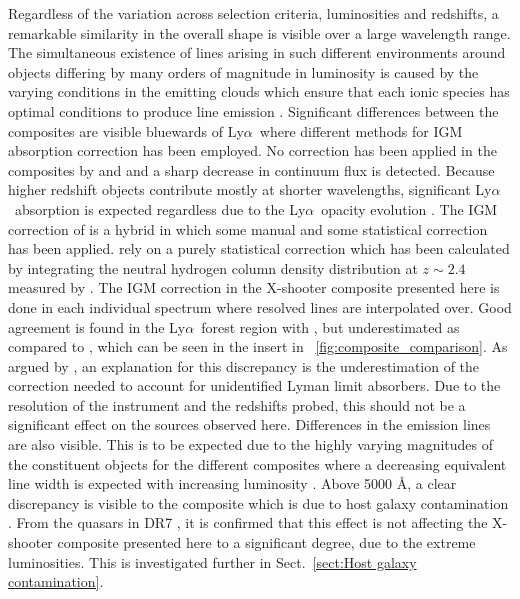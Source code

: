 \documentclass{aa}    %
\newcommand{\figref}[1]{\ref{fig:#1}}
\newcommand{\Fig}[1]{\figurename~\figref{#1}}
\newcommand{\fig}[1]{\Fig{#1}}
\newcommand{\sectionname}{Sect.}
\newcommand{\Sect}[1]{\sectionname~\ref{sect:#1}}
\newcommand{\sect}[1]{\Sect{#1}}
\newcommand{\lya}{Ly$\alpha$}
\begin{document}
Regardless of the variation across selection criteria, luminosities and
redshifts, a remarkable similarity in the overall shape is visible
over a large wavelength range. The simultaneous existence of lines
arising in such different environments around objects differing by
many orders of magnitude in luminosity is caused by the varying
conditions in the emitting clouds which ensure that each ionic species has optimal conditions to produce line emission \citep{Baldwin1995}.
Significant differences between the composites are visible bluewards of
\lya~where different methods for IGM absorption correction has been
employed. No correction has been applied in the composites by
\citet{Francis1991} and \citet{VandenBerk2001} and a sharp decrease in
continuum flux is detected. Because higher redshift objects contribute
mostly at shorter wavelengths, significant \lya~absorption is
expected regardless due to the \lya~opacity evolution
\citep{Moller1990, Madau1995, DallAglio2008}. The IGM correction of
\citet{Telfer2002} is a hybrid in which some manual and some
statistical correction has been applied. \citet{Lusso2015} rely on a purely statistical correction which has been calculated
by integrating the neutral hydrogen column density distribution at $z
\sim 2.4$ measured by \cite{Prochaska2014b}. The IGM correction in the
X-shooter composite presented here is done in each individual spectrum
where resolved lines are interpolated over. Good agreement is found in
the \lya~forest region with \cite{Telfer2002}, but underestimated as
compared to \cite{Lusso2015}, which can be seen in the insert in
\fig{composite_comparison}. As argued by \cite{Lusso2015}, an
explanation for this discrepancy is the underestimation of the
correction needed to account for unidentified Lyman limit
absorbers. Due to the resolution of the instrument and the redshifts
probed, this should not be a significant effect on the sources
observed here.  Differences in the emission lines are also
visible. This is to be expected due to the highly varying magnitudes
of the constituent objects for the different composites where a
decreasing equivalent line width is expected with increasing
luminosity \citep{Baldwin1977}.  Above 5000 \AA, a clear discrepancy
is visible to the \citet{VandenBerk2001} composite which is due to
host galaxy contamination \citep{Glikman2006}. From the quasars in
DR7 \citep{Shen2011}, it is confirmed that this effect is not
affecting the X-shooter composite presented here to a significant
degree, due to the extreme luminosities. This is investigated further
in \sect{Host galaxy
contamination}.
\end{document}
